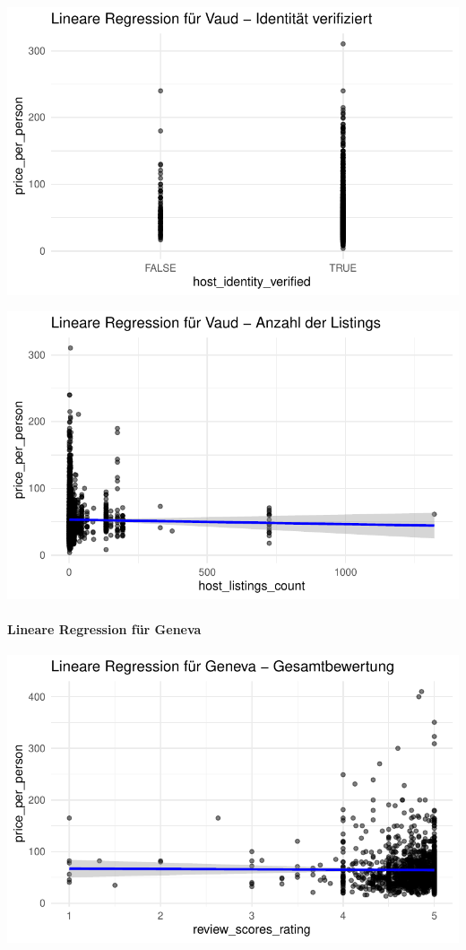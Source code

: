 \documentclass[
  journal,
]{IEEEtran}%
\let\oldparagraph\paragraph
\renewcommand{\paragraph}[1]{\oldparagraph{#1}\mbox{}}
\begin{document}
\includegraphics{main_files/figure-pdf/unnamed-chunk-15-5.pdf}

\includegraphics{main_files/figure-pdf/unnamed-chunk-15-6.pdf}

\hypertarget{lineare-regression-fuxfcr-geneva}{%
\paragraph{Lineare Regression für
Geneva}\label{lineare-regression-fuxfcr-geneva}}

\includegraphics{main_files/figure-pdf/unnamed-chunk-16-1.pdf}
\end{document}
